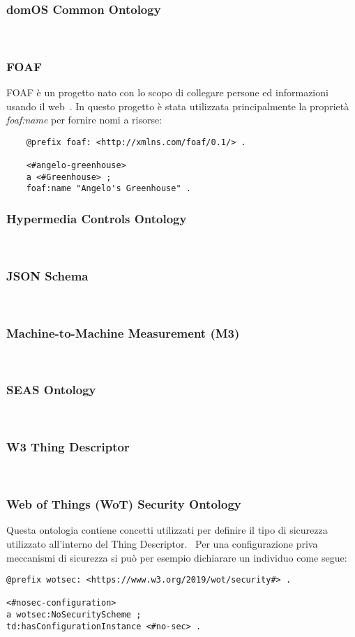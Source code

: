 \subsubsection{domOS Common Ontology}
~\cite{domOSCom57:online}
\subsubsection{FOAF}
FOAF è un progetto nato con lo scopo di collegare persone ed informazioni usando il web~\cite{FOAFVoca16:online}.
In questo progetto è stata utilizzata principalmente la proprietà \textit{foaf:name} per fornire nomi a risorse:
\begin{verbatim}
	@prefix foaf: <http://xmlns.com/foaf/0.1/> .

	<#angelo-greenhouse>
	a <#Greenhouse> ;
	foaf:name "Angelo's Greenhouse" .
\end{verbatim}

\subsubsection{Hypermedia Controls Ontology}
~\cite{Hypermed84:online}
\subsubsection{JSON Schema}
~\cite{JSONSche6:online}
\subsubsection{Machine-to-Machine Measurement (M3)}
~\cite{SWoTSema18:online}
\subsubsection{SEAS Ontology}
~\cite{SEAS:online}
\subsubsection{W3 Thing Descriptor}
~\cite{ThingDes54:online}
\subsubsection{Web of Things (WoT) Security Ontology}
Questa ontologia contiene concetti utilizzati per definire il tipo di sicurezza utilizzato all'interno del Thing Descriptor.~\cite{WebofThi54:online}
Per una configurazione priva meccanismi di sicurezza si può per esempio dichiarare un individuo come segue:
\begin{verbatim}
@prefix wotsec: <https://www.w3.org/2019/wot/security#> .

<#nosec-configuration>
a wotsec:NoSecurityScheme ;
td:hasConfigurationInstance <#no-sec> .
\end{verbatim}
